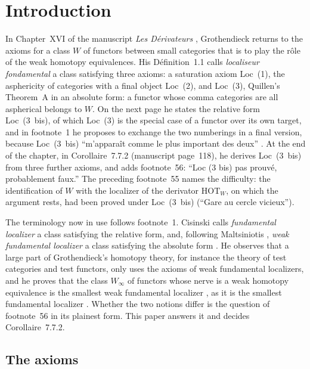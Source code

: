\documentclass[11pt,a4paper]{article}
\theoremstyle{definition}
\newcommand{\Winf}{W_{\infty}}
\begin{document}
\section{Introduction}\label{sec:intro}

In Chapter~XVI of the manuscript \emph{Les D\'erivateurs} \cite{Der}, Grothendieck returns to
the axioms for a class $W$ of functors between small categories that is to play the r\^ole
of the weak homotopy equivalences. His Définition~1.1 calls \emph{localiseur fondamental} a
class satisfying three axioms: a saturation axiom Loc~(1), the asphericity of categories
with a final object Loc~(2), and Loc~(3), Quillen's Theorem~A in an absolute form: a functor
whose comma categories are all aspherical belongs to $W$. On the next page he states the
relative form Loc~(3~bis), of which Loc~(3) is the special case of a functor over its own
target, and in footnote~1 he proposes to exchange the two numberings in a final version,
because Loc~(3~bis) ``m'appara\^it comme le plus important des deux'' \cite[XVI, p.~1]{Der}.
At the end of the chapter, in Corollaire~7.7.2 (manuscript page~118), he derives Loc~(3~bis)
from three further axioms, and adds footnote~56: ``Loc (3 bis) pas prouv\'e, probablement
faux.'' The preceding footnote~55 names the difficulty: the identification of $W$ with the
localizer of the derivator $\mathrm{HOT}_W$, on which the argument rests, had been proved
under Loc~(3~bis) (``Gare au cercle vicieux'').

The terminology now in use follows footnote~1. Cisinski \cite[D\'ef.~3.3.2]{Cis06} calls
\emph{fundamental localizer} a class satisfying the relative form, and, following
Maltsiniotis \cite[1.1.2]{Mal05}, \emph{weak fundamental localizer} a class satisfying the
absolute form \cite[6.1.12]{Cis06}. He observes that a large part of Grothendieck's
homotopy theory, for instance the theory of test categories and test functors, only uses the
axioms of weak fundamental localizers, and he proves that the class $\Winf$ of functors whose
nerve is a weak homotopy equivalence is the smallest weak fundamental localizer
\cite[Th.~6.1.18]{Cis06}, as it is the smallest fundamental localizer
\cite[Cor.~4.2.19]{Cis06}. Whether the two notions differ is the question of footnote~56 in
its plainest form. This paper answers it and decides Corollaire~7.7.2.

\subsection{The axioms}\label{subsec:axioms}
\end{document}

